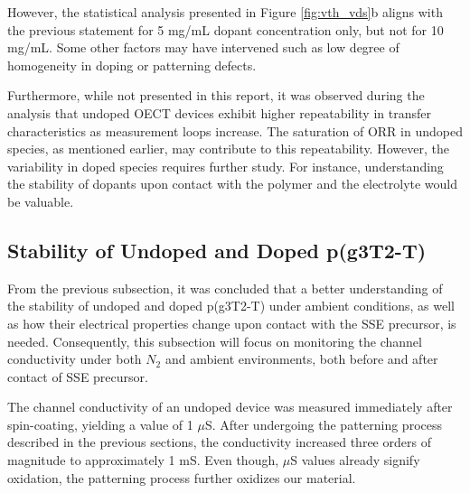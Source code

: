 However, the statistical analysis presented in Figure \ref{fig:vth_vds}b aligns with the previous statement for 5 mg/mL dopant concentration only, but not for 10 mg/mL. Some other factors may have intervened such as low degree of homogeneity in doping or patterning defects.

Furthermore, while not presented in this report, it was observed during the analysis that undoped OECT devices exhibit higher repeatability in transfer characteristics as measurement loops increase. The saturation of ORR in undoped species, as mentioned earlier, may contribute to this repeatability. However, the variability in doped species requires further study. For instance, understanding the stability of dopants upon contact with the polymer and the electrolyte would be valuable. %

\subsection{Stability of Undoped and Doped p(g3T2-T)} \label{subsec:stab}
From the previous subsection, it was concluded that a better understanding of the stability of undoped and doped p(g3T2-T) under ambient conditions, as well as how their electrical properties change upon contact with the SSE precursor, is needed. Consequently, this subsection will focus on monitoring the channel conductivity under both $N_{2}$ and ambient environments, both before and after contact of SSE precursor.

The channel conductivity of an undoped device was measured immediately after spin-coating, yielding a value of 1 $\mu$S. After undergoing the patterning process described in the previous sections, the conductivity increased three orders of magnitude to approximately 1 mS. Even though, $\mu$S values already signify oxidation, the patterning process further oxidizes our material. %

